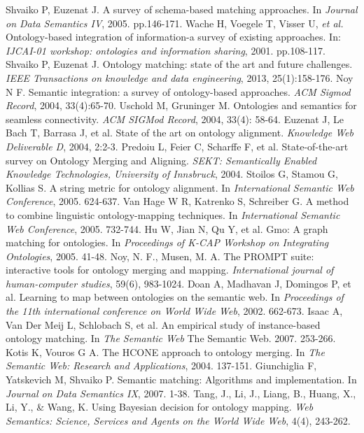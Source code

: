 \documentclass[twoside]{article}
\begin{document}
\begin{thebibliography}{99}
 Shvaiko P, Euzenat J. A survey of schema-based matching approaches. In {\it Journal on Data Semantics IV}, 2005. pp.146-171.
 Wache H, Voegele T, Visser U, {\it et al.} Ontology-based integration of information-a survey of existing approaches. In: {\it IJCAI-01 workshop: ontologies and information sharing}, 2001. pp.108-117.
 Shvaiko P, Euzenat J. Ontology matching: state of the art and future challenges. {\it IEEE Transactions on knowledge and data engineering}, 2013, 25(1):158-176.
 Noy N F. Semantic integration: a survey of ontology-based approaches. {\it ACM Sigmod Record}, 2004, 33(4):65-70.
 Uschold M, Gruninger M. Ontologies and semantics for seamless connectivity. {\it ACM SIGMod Record}, 2004, 33(4): 58-64.
 Euzenat J, Le Bach T, Barrasa J, et al. State of the art on ontology alignment. {\it Knowledge Web Deliverable D}, 2004, 2:2-3.
 Predoiu L, Feier C, Scharffe F, et al. State-of-the-art survey on Ontology Merging and Aligning. {\it SEKT: Semantically Enabled Knowledge Technologies, University of Innsbruck}, 2004.
 Stoilos G, Stamou G, Kollias S. A string metric for ontology alignment. In {\it International Semantic Web Conference}, 2005. 624-637.
 Van Hage W R, Katrenko S, Schreiber G. A method to combine linguistic ontology-mapping techniques. In {\it International Semantic Web Conference}, 2005. 732-744.
 Hu W, Jian N, Qu Y, et al. Gmo: A graph matching for ontologies. In {\it Proceedings of K-CAP Workshop on Integrating Ontologies}, 2005. 41-48.
 Noy, N. F., Musen, M. A. The PROMPT suite: interactive tools for ontology merging and mapping. {\it International journal of human-computer studies}, 59(6), 983-1024.
 Doan A, Madhavan J, Domingos P, et al. Learning to map between ontologies on the semantic web. In {\it Proceedings of the 11th international conference on World Wide Web}, 2002. 662-673.
 Isaac A, Van Der Meij L, Schlobach S, et al. An empirical study of instance-based ontology matching. In {\it The Semantic Web} The Semantic Web. 2007. 253-266.
 Kotis K, Vouros G A. The HCONE approach to ontology merging. In {\it The Semantic Web: Research and Applications}, 2004. 137-151.
 Giunchiglia F, Yatskevich M, Shvaiko P. Semantic matching: Algorithms and implementation. In {\it Journal on Data Semantics IX},  2007. 1-38.
 Tang, J., Li, J., Liang, B., Huang, X., Li, Y., \& Wang, K. Using Bayesian decision for ontology mapping. {\it Web Semantics: Science, Services and Agents on the World Wide Web}, 4(4), 243-262.

\end{thebibliography}
\end{document}
